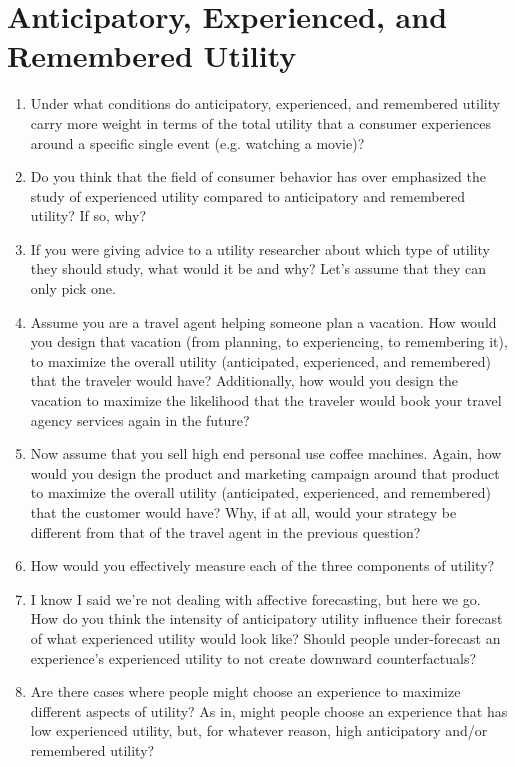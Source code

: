 \documentclass[11pt]{elegantbook}
\begin{document}
\chapter{Anticipatory, Experienced, and Remembered Utility}

\begin{enumerate}
    \item Under what conditions do anticipatory, experienced, and remembered utility carry more weight in terms of the total utility that a consumer experiences around a specific single event (e.g. watching a movie)?
    \item Do you think that the field of consumer behavior has over emphasized the study of experienced utility compared to anticipatory and remembered utility? If so, why?
    \item If you were giving advice to a utility researcher about which type of utility they should study, what would it be and why? Let’s assume that they can only pick one.
    \item Assume you are a travel agent helping someone plan a vacation. How would you design that vacation (from planning, to experiencing, to remembering it), to maximize the overall utility (anticipated, experienced, and remembered) that the traveler would have? Additionally, how would you design the vacation to maximize the likelihood that the traveler would book your travel agency services again in the future?
    \item Now assume that you sell high end personal use coffee machines. Again, how would you design the product and marketing campaign around that product to maximize the overall utility (anticipated, experienced, and remembered) that the customer would have? Why, if at all, would your strategy be different from that of the travel agent in the previous question?
    \item How would you effectively measure each of the three components of utility?
    \item I know I said we’re not dealing with affective forecasting, but here we go. How do you think the intensity of anticipatory utility influence their forecast of what experienced utility would look like? Should people under-forecast an experience’s experienced utility to not create downward counterfactuals?
    \item Are there cases where people might choose an experience to maximize different aspects of utility? As in, might people choose an experience that has low experienced utility, but, for whatever reason, high anticipatory and/or remembered utility?
\end{enumerate}
\end{document}
